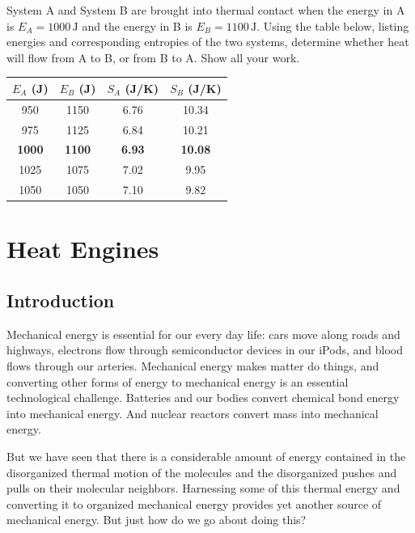 \begin{exercise}
System A and System B are brought into thermal contact when the energy in
A is $E_A= 1000\,\text{J}$ and the energy in B is $E_B=1100\,\text{J}$.
Using the table below, listing energies and corresponding entropies of
the two systems, determine whether heat will flow from A to B, or 
from B to A.  Show all your work.

\begin{center}
{\large
\renewcommand{\arraystretch}{1.8}
\begin{tabular}{|c|c|c|c|} \hline
$E_A$ (J) & $E_B$ (J)  & $S_A$ (J/K) & $S_B$ (J/K)
     \\ \hline \hline
    950   &       1150   &     6.76     &    10.34     \\ \hline
    975   &       1125   &     6.84     &    10.21     \\ \hline
\textbf{1000}&  \textbf{1100}  & \textbf{6.93}   & \textbf{  10.08} \\ \hline
    1025   &      1075   &     7.02     &     9.95     \\ \hline
    1050   &      1050   &     7.10     &     9.82     \\ \hline
\end{tabular}
\renewcommand{\arraystretch}{1.0}
}
\end{center}
\label{prob:energy_transfer_table}
\end{exercise}




\chapter{Heat Engines}
\label{chap:heat_engines}

\section{Introduction}

Mechanical energy is essential for our every day life: cars move
along roads and highways, electrons flow through 
semiconductor devices in our iPods,
and blood flows through our arteries.  Mechanical energy makes matter
do things, and converting other forms of energy to mechanical energy
is an essential technological challenge.  Batteries and our bodies
convert chemical bond energy into mechanical energy.  And nuclear reactors
convert mass into mechanical energy.

But we have seen that there is a considerable amount of energy
contained in the disorganized thermal motion of the molecules and the
disorganized pushes and pulls on their molecular neighbors.
Harnessing some of this thermal energy and converting it to organized
mechanical energy provides yet another source of mechanical energy.
But just how do we go about doing this?

